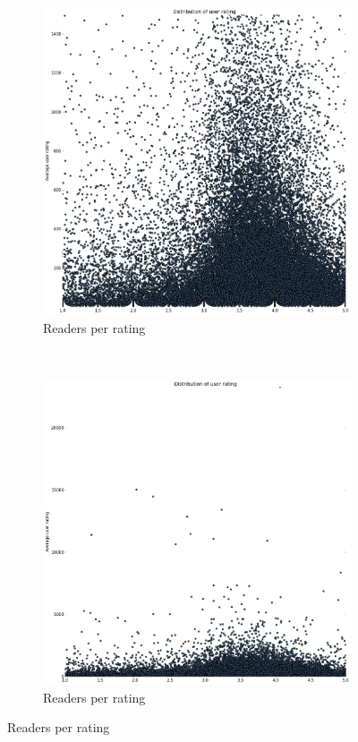 \documentclass[11pt]{article}
\begin{document}
\begin{figure}
        \begin{subfigure}[b]{0.4\textwidth}
                \includegraphics[width=\textwidth]{images/user_scatter_1500}
                \caption{Readers per rating}
        \end{subfigure}%
        ~ %
        \begin{subfigure}[b]{0.4\textwidth}
                \includegraphics[width=\textwidth]{images/user_scatter}
                \caption{Readers per rating}
        \end{subfigure}
\end{figure}
\end{document}
